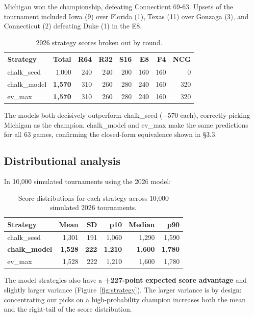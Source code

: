 \documentclass[12pt]{article}
\begin{document}
Michigan won the championship, defeating Connecticut 69-63. Upsets of the tournament included Iowa (9) over Florida (1), Texas (11) over Gonzaga (3), and Connecticut (2) defeating Duke (1) in the E8.

\begin{table}[H]
\centering
\begin{tabular}{lrrrrrrr}
\toprule
Strategy & Total & R64 & R32 & S16 & E8 & F4 & NCG \\
\midrule
chalk\_seed & 1{,}000 & 240 & 240 & 200 & 160 & 160 & 0 \\
chalk\_model & \textbf{1{,}570} & 310 & 260 & 280 & 240 & 160 & 320 \\
ev\_max & \textbf{1{,}570} & 310 & 260 & 280 & 240 & 160 & 320 \\
\bottomrule
\end{tabular}
\caption{2026 strategy scores broken out by round.}
\end{table}

The models both decisively outperform chalk\_seed (+570 each), correctly picking Michigan as the champion. chalk\_model and ev\_max make the same predictions for all 63 games, confirming the closed-form equivalence shown in \S3.3.

\subsection{Distributional analysis}

In 10{,}000 simulated tournaments using the 2026 model:

\begin{table}[H]
\centering
\begin{tabular}{lrrrrr}
\toprule
Strategy & Mean & SD & p10 & Median & p90 \\
\midrule
chalk\_seed & 1{,}301 & 191 & 1{,}060 & 1{,}290 & 1{,}590 \\
\textbf{chalk\_model} & \textbf{1{,}528} & \textbf{222} & \textbf{1{,}210} & \textbf{1{,}600} & \textbf{1{,}780} \\
ev\_max & 1{,}528 & 222 & 1{,}210 & 1{,}600 & 1{,}780 \\
\bottomrule
\end{tabular}
\caption{Score distributions for each strategy across 10{,}000 simulated 2026 tournaments.}
\end{table}

The model strategies also have a \textbf{{+227}-point expected score advantage} and slightly larger variance (Figure~\ref{fig:strategy}). The larger variance is by design: concentrating our picks on a high-probability champion increases both the mean and the right-tail of the score distribution.
\end{document}
